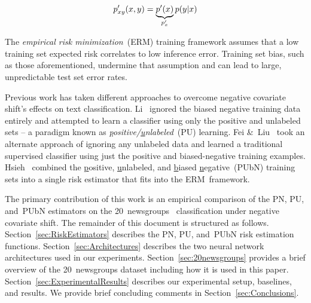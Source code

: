 \documentclass[]{subfiles}
\begin{document}
\begin{equation}\label{eq:TestDist}
  p_{xy}'(x,y) = \underbrace{p'(x)}_{p_{x}'} p(y \vert x)
\end{equation}

The \textit{empirical risk minimization}~(ERM) training framework assumes that a low training set expected risk correlates to low inference error. Training set bias, such as those aforementioned, undermine that assumption and can lead to large, unpredictable test set error rates.

Previous work has taken different approaches to overcome negative covariate shift's effects on text classification.  Li\etal~\cite{Li:2010} ignored the biased negative training data entirely and attempted to learn a classifier using only the positive and unlabeled sets -- a paradigm known as \textit{\underline{p}ositive\-/\underline{u}nlabeled}~(PU) learning.  Fei \&~Liu~\cite{Fei:2015} took an alternate approach of ignoring any unlabeled data and learned a traditional supervised classifier using just the positive and biased-negative training examples.  Hsieh\etal~\cite{Hsieh:2018} combined the \underline{p}ositive, \underline{u}nlabeled, and \underline{b}iased \underline{n}egative~(PUbN) training sets into a single risk estimator that fits into the ERM~framework.

The primary contribution of this work is an empirical comparison of the PN, PU, and~PUbN estimators on the 20~newsgroups~\cite{20newsgroups} classification under negative covariate shift.  The remainder of this document is structured as follows.  Section~\ref{sec:RiskEstimators} describes the PN, PU, and~PUbN risk estimation functions. Section~\ref{sec:Architectures} describes the two neural network architectures used in our experiments. Section~\ref{sec:20newsgroups} provides a brief overview of the 20~newsgroups dataset including how it is used in this paper. Section~\ref{sec:ExperimentalResults} describes our experimental setup, baselines, and results.  We provide brief concluding comments in Section~\ref{sec:Conclusions}.
\end{document}
